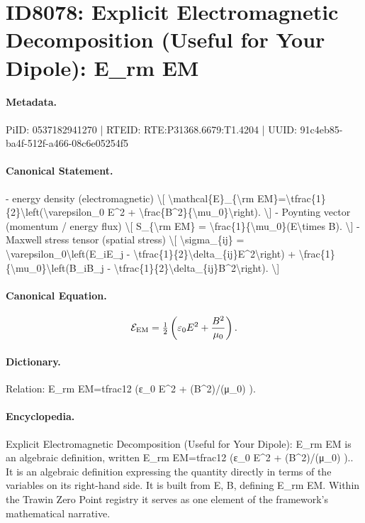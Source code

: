 \section*{ID8078: Explicit Electromagnetic Decomposition (Useful for Your Dipole): E\_rm EM}
\paragraph{Metadata.}
PiID: 0537182941270 | RTEID: RTE:P31368.6679:T1.4204 | UUID: 91c4eb85-ba4f-512f-a466-08c6e05254f5

\paragraph{Canonical Statement.}
- energy density (electromagnetic) \textbackslash{}[ \textbackslash{}mathcal\{E\}\_\{\textbackslash{}rm EM\}=\textbackslash{}tfrac\{1\}\{2\}\textbackslash{}left(\textbackslash{}varepsilon\_0 E\textasciicircum{}2 + \textbackslash{}frac\{B\textasciicircum{}2\}\{\textbackslash{}mu\_0\}\textbackslash{}right). \textbackslash{}] - Poynting vector (momentum / energy flux) \textbackslash{}[ S\_\{\textbackslash{}rm EM\} = \textbackslash{}frac\{1\}\{\textbackslash{}mu\_0\}(E\textbackslash{}times B). \textbackslash{}] - Maxwell stress tensor (spatial stress) \textbackslash{}[ \textbackslash{}sigma\_\{ij\} = \textbackslash{}varepsilon\_0\textbackslash{}left(E\_iE\_j - \textbackslash{}tfrac\{1\}\{2\}\textbackslash{}delta\_\{ij\}E\textasciicircum{}2\textbackslash{}right) + \textbackslash{}frac\{1\}\{\textbackslash{}mu\_0\}\textbackslash{}left(B\_iB\_j - \textbackslash{}tfrac\{1\}\{2\}\textbackslash{}delta\_\{ij\}B\textasciicircum{}2\textbackslash{}right). \textbackslash{}]

\paragraph{Canonical Equation.}
\[
\mathcal{E}_{\rm EM}=\tfrac{1}{2}\left(\varepsilon_0 E^2 + \frac{B^2}{\mu_0}\right).
\]

\paragraph{Dictionary.}
Relation: E\_rm EM=tfrac12 (ε\_0 E\textasciicircum{}2 + (B\textasciicircum{}2)/(μ\_0) ).

\paragraph{Encyclopedia.}
Explicit Electromagnetic Decomposition (Useful for Your Dipole): E\_rm EM is an algebraic definition, written E\_rm EM=tfrac12 (ε\_0 E\textasciicircum{}2 + (B\textasciicircum{}2)/(μ\_0) ).. It is an algebraic definition expressing the quantity directly in terms of the variables on its right-hand side. It is built from E, B, defining E\_rm EM. Within the Trawin Zero Point registry it serves as one element of the framework's mathematical narrative.
